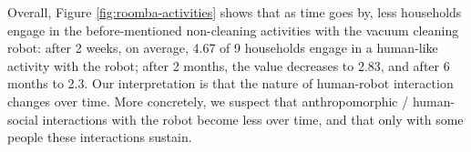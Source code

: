 \documentclass{frontiersSCNS} %
\begin{document}

Overall, Figure \ref{fig:roomba-activities} shows that as time goes by, less households engage in the before-mentioned non-cleaning activities with the vacuum cleaning robot: after 2 weeks, on average, 4.67 of 9 households engage in a human-like activity with the robot; after 2 months, the value decreases to 2.83, and after 6 months to 2.3. Our interpretation is that the nature of human-robot interaction changes over time. More concretely, we suspect  that anthropomorphic / human-social interactions with the robot become less over time, and that only with some people these interactions sustain.
\end{document}
